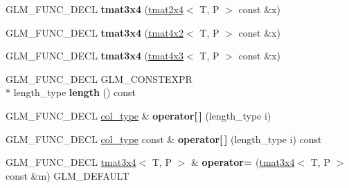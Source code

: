\begin{DoxyCompactItemize}
\item 
\hypertarget{structglm_1_1tmat3x4_a961d75609356b0a9e171af8603427539}{G\-L\-M\-\_\-\-F\-U\-N\-C\-\_\-\-D\-E\-C\-L {\bfseries tmat3x4} (\hyperlink{structglm_1_1tmat2x4}{tmat2x4}$<$ T, P $>$ const \&x)}\label{structglm_1_1tmat3x4_a961d75609356b0a9e171af8603427539}

\item 
\hypertarget{structglm_1_1tmat3x4_a2d8d364a1ed33cef60cdf0ea576867ce}{G\-L\-M\-\_\-\-F\-U\-N\-C\-\_\-\-D\-E\-C\-L {\bfseries tmat3x4} (\hyperlink{structglm_1_1tmat4x2}{tmat4x2}$<$ T, P $>$ const \&x)}\label{structglm_1_1tmat3x4_a2d8d364a1ed33cef60cdf0ea576867ce}

\item 
\hypertarget{structglm_1_1tmat3x4_a21dce2df6a5bf25e1379bdace3b28cf4}{G\-L\-M\-\_\-\-F\-U\-N\-C\-\_\-\-D\-E\-C\-L {\bfseries tmat3x4} (\hyperlink{structglm_1_1tmat4x3}{tmat4x3}$<$ T, P $>$ const \&x)}\label{structglm_1_1tmat3x4_a21dce2df6a5bf25e1379bdace3b28cf4}

\item 
\hypertarget{structglm_1_1tmat3x4_a34c0210b9f13d3f85c52cf43a53cd906}{G\-L\-M\-\_\-\-F\-U\-N\-C\-\_\-\-D\-E\-C\-L G\-L\-M\-\_\-\-C\-O\-N\-S\-T\-E\-X\-P\-R \\*
length\-\_\-type {\bfseries length} () const }\label{structglm_1_1tmat3x4_a34c0210b9f13d3f85c52cf43a53cd906}

\item 
\hypertarget{structglm_1_1tmat3x4_adba2ef1be4b50bfaa63e5469310f1d87}{G\-L\-M\-\_\-\-F\-U\-N\-C\-\_\-\-D\-E\-C\-L \hyperlink{structglm_1_1tvec4}{col\-\_\-type} \& {\bfseries operator\mbox{[}$\,$\mbox{]}} (length\-\_\-type i)}\label{structglm_1_1tmat3x4_adba2ef1be4b50bfaa63e5469310f1d87}

\item 
\hypertarget{structglm_1_1tmat3x4_ad5df71fd9f9d2cd286395d1d31f07813}{G\-L\-M\-\_\-\-F\-U\-N\-C\-\_\-\-D\-E\-C\-L \hyperlink{structglm_1_1tvec4}{col\-\_\-type} const \& {\bfseries operator\mbox{[}$\,$\mbox{]}} (length\-\_\-type i) const }\label{structglm_1_1tmat3x4_ad5df71fd9f9d2cd286395d1d31f07813}

\item 
\hypertarget{structglm_1_1tmat3x4_ad99024aa090d9e589de54e9e237af476}{G\-L\-M\-\_\-\-F\-U\-N\-C\-\_\-\-D\-E\-C\-L \hyperlink{structglm_1_1tmat3x4}{tmat3x4}$<$ T, P $>$ \& {\bfseries operator=} (\hyperlink{structglm_1_1tmat3x4}{tmat3x4}$<$ T, P $>$ const \&m) G\-L\-M\-\_\-\-D\-E\-F\-A\-U\-L\-T}\label{structglm_1_1tmat3x4_ad99024aa090d9e589de54e9e237af476}


\end{DoxyCompactItemize}
